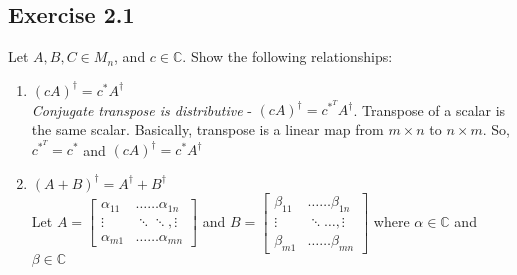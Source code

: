 \documentclass[12pt]{article}
\theoremstyle{plain}
\theoremstyle{nonumberplain}
\theoremstyle{plain}
\theoremstyle{nonumberplain}
\newcommand\1{{\bf 1}}
\newcommand{\C}{\mathbb{C}} %
\newcommand{\<}{\left\langle}
\renewcommand{\>}{\right\rangle}
\begin{document}

\subsection{Exercise 2.1}
Let $A,B,C\in M_n$, and $c\in\C$. Show the following relationships:
\begin{enumerate}[label=(\alph*)]
\item $\left(cA\right) ^\dagger=c^*A^\dagger$ \\
\textit{Conjugate transpose is distributive} - $(cA)^\dagger=c^{*^T}A^\dagger$. Transpose of a scalar is the same scalar. Basically, transpose is a linear map from $m\times n$ to $n \times m$. So, $c^{*^T}=c^*$ and $\left(cA\right) ^\dagger=c^*A^\dagger$
\item $\left(A+B\right)^\dagger=A^\dagger+B^\dagger$ \\
Let $A=\begin{bmatrix}
\alpha _{11} & \ldots \ldots \alpha _{1n} \\
\vdots  & \ddots \ddots ,\vdots  \\
\alpha _{m1} & \ldots \ldots \alpha _{mn}
\end{bmatrix}$ and $B=\begin{bmatrix}
\beta _{11} & \ldots \ldots \beta _{1n} \\
\vdots  & \ddots \ldots ,\vdots  \\
\beta _{m1} & \ldots \ldots \beta _{mn}
\end{bmatrix}$ where $\alpha\in\C$ and $\beta\in\C$ \\


\end{enumerate}
\end{document}
